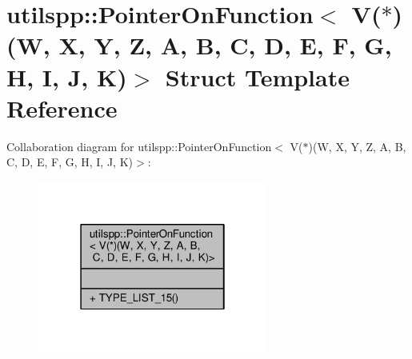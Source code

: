 \hypertarget{structutilspp_1_1PointerOnFunction_3_01V_07_5_08_07W_00_01X_00_01Y_00_01Z_00_01A_00_01B_00_01C_0b606863df3010e6d72b4ceda3747c75c}{\section{utilspp\-:\-:Pointer\-On\-Function$<$ V($\ast$)(W, X, Y, Z, A, B, C, D, E, F, G, H, I, J, K)$>$ Struct Template Reference}
\label{structutilspp_1_1PointerOnFunction_3_01V_07_5_08_07W_00_01X_00_01Y_00_01Z_00_01A_00_01B_00_01C_0b606863df3010e6d72b4ceda3747c75c}
}


Collaboration diagram for utilspp\-:\-:Pointer\-On\-Function$<$ V($\ast$)(W, X, Y, Z, A, B, C, D, E, F, G, H, I, J, K)$>$\-:
\nopagebreak
\begin{figure}[H]
\begin{center}
\leavevmode
\includegraphics[width=214pt]{structutilspp_1_1PointerOnFunction_3_01V_07_5_08_07W_00_01X_00_01Y_00_01Z_00_01A_00_01B_00_01C_03e6cec023102e37e02e8026fc0a85bb0}
\end{center}
\end{figure}

